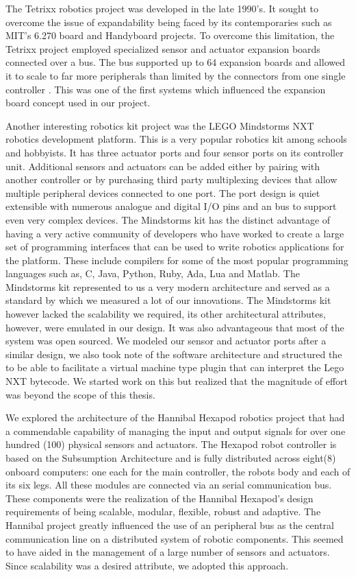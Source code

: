 The Tetrixx robotics project was developed in the late 1990's. It sought to overcome the issue of expandability being faced by its contemporaries such as MIT's 6.270 board and Handyboard projects. To overcome this limitation, the Tetrixx project employed specialized sensor and actuator expansion boards connected over a bus. The bus supported up to 64 expansion boards and allowed it to scale to far more peripherals than limited by the connectors from one single controller \cite{tetrixx}. This was one of the first systems which influenced the expansion board concept used in our project.

Another interesting robotics kit project was the LEGO Mindstorms NXT robotics development platform. This is a very popular robotics kit among schools and hobbyists. It has three actuator ports and four sensor ports on its controller unit. Additional sensors and actuators can be added either by pairing with another controller or by purchasing third party multiplexing devices that allow multiple peripheral devices connected to one port. The port design is quiet extensible with numerous analogue and digital I/O pins and an \iic bus to support even very complex devices. The Mindstorms kit has the distinct advantage of having a very active community of developers who have worked to create a large set of programming interfaces that can be used to write robotics applications for the platform. These include compilers for some of the most popular programming languages such as, C, Java, Python, Ruby, Ada, Lua and Matlab. The Mindstorms kit represented to us a very modern architecture and served as a standard by which we measured a lot of our innovations. The Mindstorms kit however lacked the scalability we required, its other architectural attributes, however, were emulated in our design. It was also advantageous that most of the system was open sourced. We modeled our sensor and actuator ports after a similar design, we also took note of the software architecture and structured the \xten to be able to facilitate a virtual machine type plugin that can interpret the Lego NXT bytecode. We started work on this but realized that the magnitude of effort was beyond the scope of this thesis.

We explored the architecture of the Hannibal Hexapod robotics project that had a commendable capability of managing the input and output signals for over one hundred (100) physical sensors and actuators. The Hexapod robot controller is based on the Subsumption Architecture and is fully distributed across eight(8) onboard computers: one each for the main controller, the robots body and each of its six legs. All these modules are connected via an \iic serial communication bus. These components were the realization of the Hannibal Hexapod's design requirements of being scalable, modular, flexible, robust and adaptive. The Hannibal project greatly influenced the use of an \iic peripheral bus as the central communication line on a distributed system of robotic components. This seemed to have aided in the management of a large number of sensors and actuators. Since scalability was a desired attribute, we adopted this approach.

